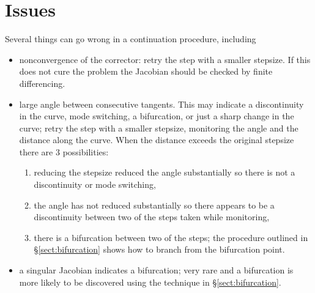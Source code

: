 \documentclass[10pt,openany,twoside]{book}
\numberwithin{equation}{section}   %
\newcommand{\Sectref}[1]{\S\ref{#1}}
\begin{document}
\section{Issues}\label{sect:issues}
Several things can go wrong in a continuation procedure, including
\begin{itemize}
	\item nonconvergence of the corrector: retry the step with a smaller stepsize.
		If this does not cure the problem the Jacobian should be checked by finite
		differencing.
	\item large angle between consecutive tangents. This may indicate
		a discontinuity in the curve, mode switching, a bifurcation,
		or just a sharp change in the curve; retry the step with a smaller
		stepsize, monitoring the angle and the distance along the curve.
		When the distance exceeds the original stepsize there are 3 possibilities:
		\begin{enumerate}
			\item reducing the stepsize reduced the angle substantially so there
				is not a discontinuity or mode switching,
			\item the angle has not reduced substantially so there appears to
				be a discontinuity between two of the steps taken while monitoring,
			\item there is a bifurcation between two of the steps; the procedure
				outlined in \Sectref{sect:bifurcation} shows how to branch from
				the bifurcation point.
		\end{enumerate}
	\item a singular Jacobian indicates a bifurcation; very rare and
		a bifurcation is more likely to be discovered using the
		technique in \Sectref{sect:bifurcation}.
\end{itemize}
\end{document}
